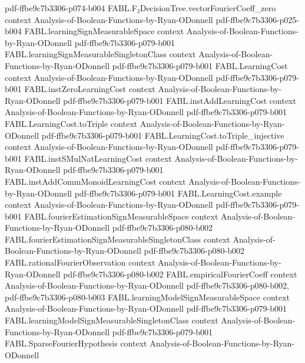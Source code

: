 \begin{theorem}
  {pdf-ffbe9c7b3306-p074-b004}
\proofstep
  {FABL.F₂DecisionTree.vectorFourierCoeff_zero}
  {context}
  {Analysis-of-Boolean-Functions-by-Ryan-ODonnell}
  {pdf-ffbe9c7b3306-p025-b004}
\proofstep
  {FABL.learningSignMeasurableSpace}
  {context}
  {Analysis-of-Boolean-Functions-by-Ryan-ODonnell}
  {pdf-ffbe9c7b3306-p079-b001}
\proofstep
  {FABL.learningSignMeasurableSingletonClass}
  {context}
  {Analysis-of-Boolean-Functions-by-Ryan-ODonnell}
  {pdf-ffbe9c7b3306-p079-b001}
\proofstep
  {FABL.LearningCost}
  {context}
  {Analysis-of-Boolean-Functions-by-Ryan-ODonnell}
  {pdf-ffbe9c7b3306-p079-b001}
\proofstep
  {FABL.instZeroLearningCost}
  {context}
  {Analysis-of-Boolean-Functions-by-Ryan-ODonnell}
  {pdf-ffbe9c7b3306-p079-b001}
\proofstep
  {FABL.instAddLearningCost}
  {context}
  {Analysis-of-Boolean-Functions-by-Ryan-ODonnell}
  {pdf-ffbe9c7b3306-p079-b001}
\proofstep
  {FABL.LearningCost.toTriple}
  {context}
  {Analysis-of-Boolean-Functions-by-Ryan-ODonnell}
  {pdf-ffbe9c7b3306-p079-b001}
\proofstep
  {FABL.LearningCost.toTriple_injective}
  {context}
  {Analysis-of-Boolean-Functions-by-Ryan-ODonnell}
  {pdf-ffbe9c7b3306-p079-b001}
\proofstep
  {FABL.instSMulNatLearningCost}
  {context}
  {Analysis-of-Boolean-Functions-by-Ryan-ODonnell}
  {pdf-ffbe9c7b3306-p079-b001}
\proofstep
  {FABL.instAddCommMonoidLearningCost}
  {context}
  {Analysis-of-Boolean-Functions-by-Ryan-ODonnell}
  {pdf-ffbe9c7b3306-p079-b001}
\proofstep
  {FABL.LearningCost.example}
  {context}
  {Analysis-of-Boolean-Functions-by-Ryan-ODonnell}
  {pdf-ffbe9c7b3306-p079-b001}
\proofstep
  {FABL.fourierEstimationSignMeasurableSpace}
  {context}
  {Analysis-of-Boolean-Functions-by-Ryan-ODonnell}
  {pdf-ffbe9c7b3306-p080-b002}
\proofstep
  {FABL.fourierEstimationSignMeasurableSingletonClass}
  {context}
  {Analysis-of-Boolean-Functions-by-Ryan-ODonnell}
  {pdf-ffbe9c7b3306-p080-b002}
\proofstep
  {FABL.rationalFourierObservation}
  {context}
  {Analysis-of-Boolean-Functions-by-Ryan-ODonnell}
  {pdf-ffbe9c7b3306-p080-b002}
\proofstep
  {FABL.empiricalFourierCoeff}
  {context}
  {Analysis-of-Boolean-Functions-by-Ryan-ODonnell}
  {pdf-ffbe9c7b3306-p080-b002,
    pdf-ffbe9c7b3306-p080-b003}
\proofstep
  {FABL.learningModelSignMeasurableSpace}
  {context}
  {Analysis-of-Boolean-Functions-by-Ryan-ODonnell}
  {pdf-ffbe9c7b3306-p079-b001}
\proofstep
  {FABL.learningModelSignMeasurableSingletonClass}
  {context}
  {Analysis-of-Boolean-Functions-by-Ryan-ODonnell}
  {pdf-ffbe9c7b3306-p079-b001}
\proofstep
  {FABL.SparseFourierHypothesis}
  {context}
  {Analysis-of-Boolean-Functions-by-Ryan-ODonnell}

\end{theorem}
